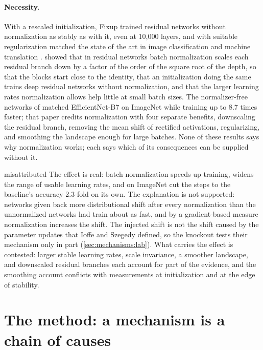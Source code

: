 \begin{refsection}
\paragraph{Necessity.} With a rescaled initialization, Fixup trained residual networks without normalization as stably as with it, even at 10,000 layers, and with suitable regularization matched the state of the art in image classification and machine translation \parencite{ZhangDauphinMa2019}. \Textcite{DeSmith2020} showed that in residual networks batch normalization scales each residual branch down by a factor of the order of the square root of the depth, so that the blocks start close to the identity, that an initialization doing the same trains deep residual networks without normalization, and that the larger learning rates normalization allows help little at small batch sizes. The normalizer-free networks of \textcite{BrockEtAl2021} matched EfficientNet-B7 on ImageNet while training up to 8.7 times faster; that paper credits normalization with four separate benefits, downscaling the residual branch, removing the mean shift of rectified activations, regularizing, and smoothing the landscape enough for large batches. None of these results says why normalization works; each says which of its consequences can be supplied without it.

\begin{verdict}{misattributed}
The effect is real: batch normalization speeds up training, widens the range of usable learning rates, and on ImageNet cut the steps to the baseline's accuracy 2.3-fold on its own. The explanation is not supported: networks given back more distributional shift after every normalization than the unnormalized networks had train about as fast, and by a gradient-based measure normalization increases the shift. The injected shift is not the shift caused by the parameter updates that Ioffe and Szegedy defined, so the knockout tests their mechanism only in part (\cref{sec:mechanisms:lab}). What carries the effect is contested: larger stable learning rates, scale invariance, a smoother landscape, and downscaled residual branches each account for part of the evidence, and the smoothing account conflicts with measurements at initialization and at the edge of stability.
\end{verdict}

\section{The method: a mechanism is a chain of causes}\label{sec:mechanisms:mediation}


\end{refsection}

